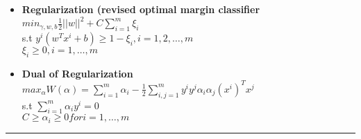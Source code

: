 \documentclass[10pt,landscape]{article}
\begin{document}
\begin{multicols}{3}
\begin{itemize}
\item \textbf{Regularization (revised optimal margin classifier}\\$min_{\gamma, w, b} \frac{1}{2} ||w||^2 + C\sum_{i = 1}^{m}\xi_i $\\
s.t $y^i(w^Tx^i +b) \geq 1-\xi_i, i = 1, 2, \dots, m$ \\
$\xi_i \geq 0, i = 1, \dots, m$\\
\item \textbf{Dual of Regularization} \\
$max_\alpha W(\alpha) = \sum_{i = 1}^{m}\alpha_i - \frac{1}{2}\sum_{i, j = 1}^{m}y^i y^j \alpha_i \alpha_j (x^i)^Tx^j$\\
s.t $\sum_{i = 1}^{m}\alpha_i y^i = 0$\\
$C \geq \alpha_i \geq 0 for i = 1, \dots, m$
\end{itemize}
\rule{0.3\linewidth}{0.25pt}
\scriptsize


\end{multicols}
\end{document}
